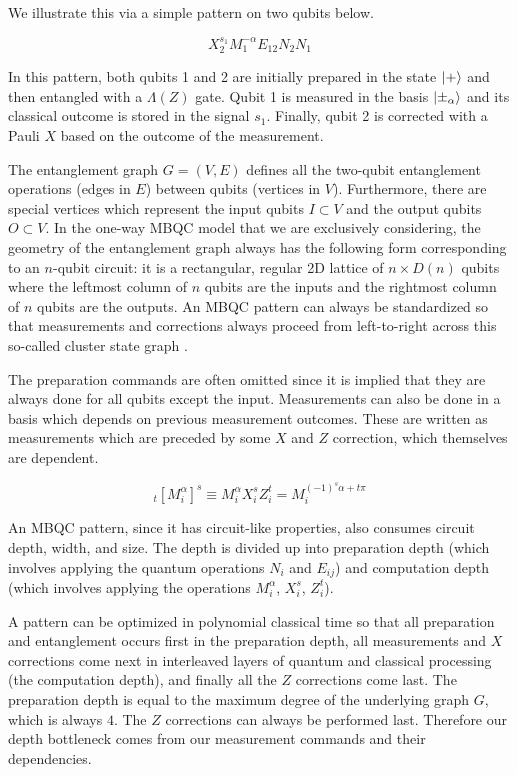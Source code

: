 We illustrate this via a simple pattern on two qubits below.

\begin{equation}
X^{s_1}_2 M^{-\alpha}_1 E_{12} N_2 N_1
\end{equation}

In this pattern, both qubits 1 and 2 are initially prepared in the
state $\left\vert{+}\right\rangle$ and then entangled with a $\Lambda(Z)$ gate.
Qubit 1 is measured in the basis $\left\vert{\pm_{\alpha}}\right\rangle$ and its
classical outcome is stored in the signal $s_1$. Finally,
qubit 2 is corrected with a Pauli $X$ based on the outcome of
the measurement.

The entanglement graph $G = (V,E)$ defines all the two-qubit entanglement
operations (edges in $E$) between qubits (vertices in $V$). Furthermore,
there are special vertices which represent the input
qubits $I \subset V$ and the output qubits $O \subset V$. In the one-way
MBQC model that we are exclusively considering,
the geometry of the entanglement graph always has the following form
corresponding to an $n$-qubit circuit: it is a
rectangular, regular 2D lattice of $n \times D(n)$ qubits where the
leftmost column of $n$ qubits are the inputs and the rightmost
column of $n$ qubits are the outputs. An
MBQC pattern can always be standardized so that measurements and corrections
always proceed from left-to-right across this so-called cluster state graph
\cite{Raussendorf2003}.

The preparation commands are often omitted since it is implied that they
are always done for all qubits except the input.
Measurements can also be done in a basis which depends on previous
measurement outcomes. These are written as measurements which are
preceded by some $X$ and $Z$ correction, which themselves are dependent.

\begin{equation}
_t\left[M^{\alpha}_i\right]^s \equiv M^{\alpha}_i X^s_i Z^t_i =
M_i^{(-1)^s \alpha + t\pi}
\end{equation}

An MBQC pattern, since it has circuit-like properties, also consumes
circuit depth, width, and size. The depth is divided up into
preparation depth (which involves applying the quantum operations
$N_i$ and $E_{ij}$) and computation depth (which involves applying
the operations $M^{\alpha}_i$, $X^{s}_i$, $Z^{t}_i$).

A pattern can be optimized in polynomial classical time so that
all preparation and entanglement occurs first in the preparation depth,
all measurements and $X$ corrections come next in interleaved layers of
quantum and classical processing (the computation depth),
and finally all the $Z$ corrections come
last. The preparation depth is equal to the maximum degree of the
underlying graph $G$, which is always $4$. The $Z$ corrections can
always be performed last.
Therefore our depth bottleneck
comes from our measurement commands and their dependencies.

